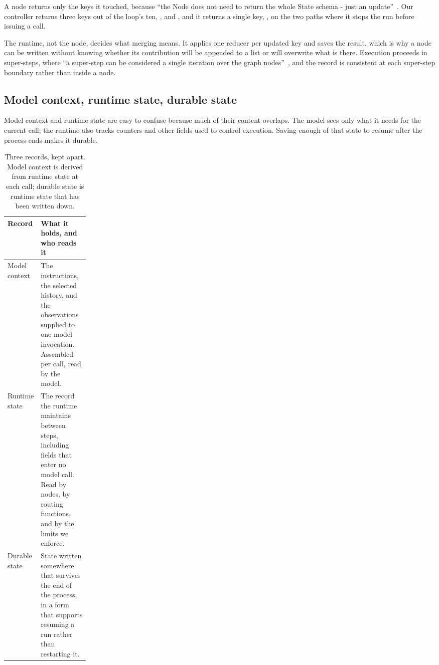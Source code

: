 A node returns only the keys it touched, because ``the Node does not need to return the whole State
schema - just an update''~\citep{langgraph-graph-api}. Our controller returns three keys out of the
loop's ten, ,  and , and it returns a
single key, , on the two paths where it stops the run before issuing a call.

The runtime, not the node, decides what merging means. It applies one reducer per updated key and
saves the result, which is why a node can be written without knowing whether its contribution will
be appended to a list or will overwrite what is there. Execution proceeds in super-steps, where ``a
super-step can be considered a single iteration over the graph nodes''~\citep{langgraph-graph-api},
and the record is consistent at each super-step boundary rather than inside a node.

\subsection{Model context, runtime state, durable state}
\label{sec:state-three}

Model context and runtime state are easy to confuse because much of their content overlaps.
The model sees only what it needs for the current call; the runtime also tracks counters and other
fields used to control execution. Saving enough of that state to resume after the process ends
makes it durable.

\begin{table}[htbp]
  \centering
  \begin{adjustbox}{width=\linewidth}\begin{tabularx}{\linewidth}{@{}L{0.19\linewidth}X@{}}
    \toprule
    \textbf{Record} & \textbf{What it holds, and who reads it} \\
    \midrule
    Model context & The instructions, the selected history, and the observations supplied to one
    model invocation. Assembled per call, read by the model. \\
    Runtime state & The record the runtime maintains between steps, including fields that enter
    no model call. Read by nodes, by routing functions, and by the limits we enforce. \\
    Durable state & State written somewhere that survives the end of the process, in a form that
    supports resuming a run rather than restarting it. \\
    \bottomrule
  \end{tabularx}\end{adjustbox}
  \caption{Three records, kept apart. Model context is derived from runtime state at each call;
  durable state is runtime state that has been written down.}
  \label{tab:state-three}
\end{table}

